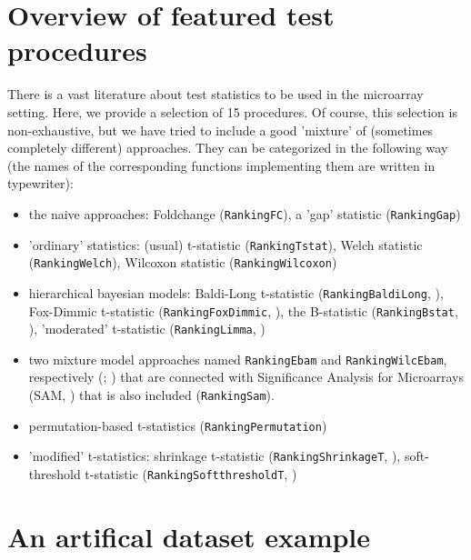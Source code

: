 \hypertarget{statisticsoverview}{\section{Overview of featured test procedures}}
There is a vast literature about test statistics to be used in the microarray
setting. Here, we provide a selection of 15 procedures. Of course, this selection
is non-exhaustive, but we have tried to include a good 'mixture'
of (sometimes completely different) approaches. They can be categorized in
the following way (the names of the corresponding functions implementing them are
written in typewriter):
\begin{itemize}
\item the naive approaches: Foldchange (\texttt{RankingFC}), a 'gap' statistic
      (\texttt{RankingGap})
\item 'ordinary' statistics: (usual) t-statistic (\texttt{RankingTstat}),
       Welch statistic (\texttt{RankingWelch}), Wilcoxon statistic
       (\texttt{RankingWilcoxon})
\item hierarchical bayesian models: Baldi-Long t-statistic
      (\texttt{RankingBaldiLong}, \citet{BaldiLong}),
      Fox-Dimmic t-statistic (\texttt{RankingFoxDimmic}, \citet{FoxDimmic}),
      the B-statistic (\texttt{RankingBstat}, \citet{Loennstedt}),
      'moderated' t-statistic (\texttt{RankingLimma}, \citet{Smyth})
\item two mixture model approaches named \texttt{RankingEbam} and
      \texttt{RankingWilcEbam}, respectively
      (\citet{Efron1}; \citet{Efron2}) that are
      connected with Significance Analysis for Microarrays
      (SAM, \citet{Tusher}) that is also included (\texttt{RankingSam}).
\item permutation-based t-statistics (\texttt{RankingPermutation})
\item 'modified' t-statistics: shrinkage t-statistic
      (\texttt{RankingShrinkageT}, \citet{st}), soft-threshold
       t-statistic (\texttt{RankingSoftthresholdT}, \citet{softt})
\end{itemize}


\section{An artifical dataset example}
